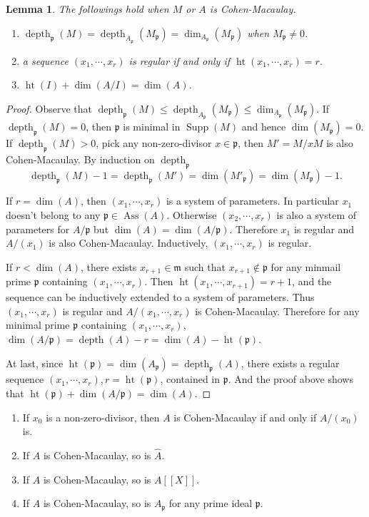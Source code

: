 \documentclass[leqno]{amsart}
\DeclareMathOperator{\hht}{ht}
\DeclareMathOperator{\Supp}{Supp}
\DeclareMathOperator{\Ass}{Ass}
\DeclareMathOperator{\depth}{depth}
\newcommand{\1}{\mathbf{1}}
\newcommand{\fm}{\mathfrak m}
\newcommand{\fp}{\mathfrak p}
\newtheorem{lem}[thm]{Lemma}
\theoremstyle{definition}
\theoremstyle{remark}
\begin{document}
\begin{lem}
	The followings hold when $M$ or $A$ is Cohen-Macaulay.
	\begin{enumerate}[label=(\alph*)]
		\item $\depth_\fp(M)=\depth_{A_\fp}(M_\fp)=\dim_{A_{\fp}}(M_\fp)$
		when  $M_\fp\neq 0$.
		\item a sequence  $(x_1,\cdots,x_r)$ is regular
		if and only if $\hht(x_1,\cdots,x_r)=r$.
		\item $\hht(I)+\dim(A/I)=\dim(A)$.
	\end{enumerate}
\end{lem}
\begin{proof}
	Observe that 
	$\depth_\fp(M)\leq \depth_{A_\fp}(M_\fp)
	\leq\dim_{A_{\fp}}(M_\fp)$.
	If $\depth_\fp(M)=0$, 
	then $\fp$ is minimal 
	in $\Supp(M)$ and hence $\dim(M_\fp)=0$.
	If $\depth_\fp(M)>0$,
	pick any non-zero-divisor $x\in \fp$,
	then $M'=M/xM$ is also Cohen-Macaulay.
	By induction on $\depth_\fp$
	\[
		 \depth_\fp(M)-1=\depth_\fp(M')=\dim(M'_\fp)=
		 \dim(M_\fp)-1.
	\]

	If $r=\dim(A)$, then $(x_1,\cdots,x_r)$
	is a system of parameters.
	In particular
	$x_1$ doesn't belong to 
	any $\fp\in \Ass(A)$.
	Otherwise $(x_2,\cdots,x_r)$
	is also a system of parameters 
	for $A/\fp$ but $\dim(A)=\dim(A/\fp)$.
	Therefore $x_1$ is regular
	and $A/(x_1)$ is also Cohen-Macaulay.
	Inductively, 
	$(x_1,\cdots,x_r)$ is regular.


	If $r<\dim(A)$, 
	there exists $x_{r+1}\in \fm$
	such that $x_{r+1}\notin\fp$
	for any minmail prime 
	$\fp$ containing $(x_1,\cdots,x_r)$.
	Then $\hht(x_1,\cdots,x_{r+1})=r+1$,
	and the sequence can be inductively
	extended to a system of parameters.
	Thus $(x_1,\cdots,x_r)$ is regular
	and $A/(x_1,\cdots,x_r)$ is 
	Cohen-Macaulay.
	Therefore for any minimal prime
	$\fp$ containing $(x_1,\cdots,x_r)$,
	$\dim(A/\fp)=\depth(A)-r
	=\dim(A)-\hht(\fp)$.

	At last, since $\hht(\fp)=\dim(A_\fp)=\depth_\fp(A)$,
	there exists a regular sequence  $(x_1,\cdots,x_r), 
	r=\hht(\fp)$, contained in $\fp$.
	And the proof above shows that 
	$\hht(\fp)+\dim(A/\fp)=\dim(A)$.
\end{proof}

\begin{enumerate}
	\item If $x_0$ is a non-zero-divisor, then
		 $A$ is Cohen-Macaulay if and only if 
		 $A/(x_0)$ is.
	 \item If $A$ is Cohen-Macaulay, so is $\hat{A}$.
	 \item If $A$ is Cohen-Macaulay, so is $A[[X]]$.
	 \item If $A$ is Cohen-Macaulay, so is $A_\fp$
		 for any prime ideal $\fp$.
\end{enumerate}
\end{document}
